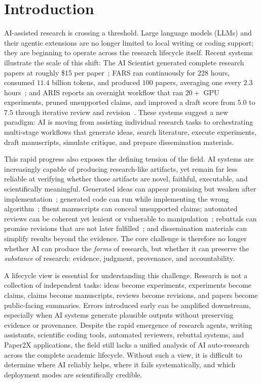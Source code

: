 \documentclass{llmxive}
\begin{document}
\setcounter{tocdepth}{3}
\tableofcontents




\section{Introduction}
\label{sec:introduction}

AI-assisted research is crossing a threshold. Large language models (LLMs) and their agentic extensions are no longer limited to local writing or coding support; they are beginning to operate across the research lifecycle itself. Recent systems illustrate the scale of this shift: The AI Scientist generated complete research papers at roughly \$15 per paper~\cite{lu2024aiscientist}; FARS ran continuously for $228$ hours, consumed $11.4$ billion tokens, and produced $100$ papers, averaging one every $2.3$ hours~\cite{fars2026_report}; and ARIS reports an overnight workflow that ran $20+$ GPU experiments, pruned unsupported claims, and improved a draft score from $5.0$ to $7.5$ through iterative review and revision~\cite{aris2025}. These systems suggest a new paradigm: AI is moving from assisting individual research tasks to orchestrating multi-stage workflows that generate ideas, search literature, execute experiments, draft manuscripts, simulate critique, and prepare dissemination materials.

This rapid progress also exposes the defining tension of the field. AI systems are increasingly capable of producing research-like artifacts, yet remain far less reliable at verifying whether those artifacts are novel, faithful, executable, and scientifically meaningful. Generated ideas can appear promising but weaken after implementation~\cite{si2025gap}; generated code can run while implementing the wrong algorithm~\cite{researchcodebench2025}; fluent manuscripts can conceal unsupported claims; automated reviews can be coherent yet lenient or vulnerable to manipulation~\cite{llmreviewer2025}; rebuttals can promise revisions that are not later fulfilled~\cite{rebuttalcommitment2026}; and dissemination materials can simplify results beyond the evidence. The core challenge is therefore no longer whether AI can produce the \emph{forms} of research, but whether it can preserve the \emph{substance} of research: evidence, judgment, provenance, and accountability.

A lifecycle view is essential for understanding this challenge. Research is not a collection of independent tasks: ideas become experiments, experiments become claims, claims become manuscripts, reviews become revisions, and papers become public-facing summaries. Errors introduced early can be amplified downstream, especially when AI systems generate plausible outputs without preserving evidence or provenance. Despite the rapid emergence of research agents, writing assistants, scientific coding tools, automated reviewers, rebuttal systems, and Paper2X applications, the field still lacks a unified analysis of AI auto-research across the complete academic lifecycle. Without such a view, it is difficult to determine where AI reliably helps, where it fails systematically, and which deployment modes are scientifically credible.
\end{document}
